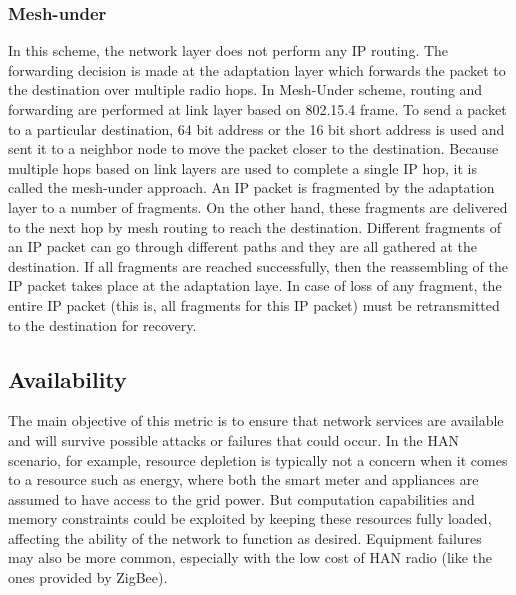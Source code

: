\documentclass[11pt,final,onecolumn]{IEEEtran}
\begin{document}
\subsubsection{Mesh-under}
In this scheme, the network layer does not perform any IP routing. The forwarding decision is made at the adaptation layer which forwards the packet to the destination over multiple radio hops. In Mesh-Under scheme, routing and forwarding are performed at link layer based on 802.15.4 frame. To send a packet to a particular destination, 64 bit address or the 16 bit short address is used and sent it to a neighbor node to move the packet closer to the destination. Because multiple hops based on link layers are used to complete a single IP hop, it is called the mesh-under approach. An IP packet is fragmented by the adaptation layer to a number of fragments. On the other hand, these fragments are delivered to the next hop by mesh routing to reach the destination. Different fragments of an IP packet can go through different paths and they are all gathered at the destination. If all fragments are reached successfully, then the reassembling of the IP packet takes place at the adaptation laye. In case of loss of any fragment, the entire IP packet (this is, all fragments for this IP packet) must be retransmitted to the destination for recovery.

\subsection{Availability}

The main objective of this metric is to ensure that network services are available and will survive possible attacks or failures that could occur. In the HAN scenario, for example, resource depletion is typically not a concern when it comes to a resource such as energy, where both the smart meter and appliances are assumed to have access to the grid power. But computation capabilities and memory constraints could be exploited by keeping these resources fully loaded, affecting the ability of the network to function as desired. Equipment failures may also be more common, especially with the low cost of HAN radio (like the ones provided by ZigBee).
\end{document}
